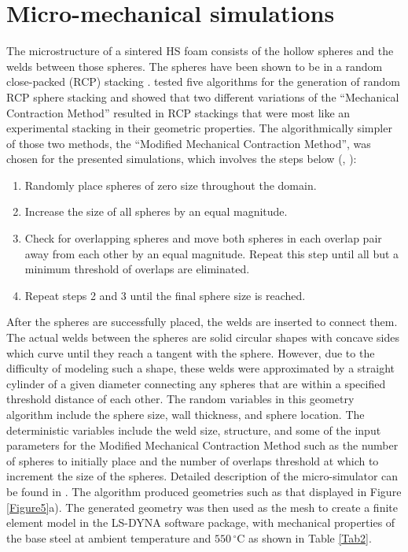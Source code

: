 \documentclass[review]{elsarticle}
\begin{document}
{\section{Micro-mechanical simulations}

The microstructure of a sintered HS foam consists of the hollow spheres and the welds between those spheres. The spheres have been shown to be in a random close-packed (RCP) stacking \cite{Gaoetal2008}. \cite{WouPhi2006} tested five algorithms for the generation of random RCP sphere stacking and showed that two different variations of the “Mechanical Contraction Method” resulted in RCP stackings that were most like an experimental stacking in their geometric properties. The algorithmically simpler of those two methods, the “Modified Mechanical Contraction Method”, was chosen for the presented simulations, which involves the steps below (\cite{Kansaletal2002}, \cite{WilliamsandPhilipse2003}):

\begin{enumerate}
	\item Randomly place spheres of zero size throughout the domain.
	\item Increase the size of all spheres by an equal magnitude.
	\item Check for overlapping spheres and move both spheres in each overlap pair away from each other by an equal magnitude. Repeat this step until all but a minimum threshold of overlaps are eliminated.
	\item Repeat steps 2 and 3 until the final sphere size is reached.
\end{enumerate}

After the spheres are successfully placed, the welds are inserted to connect them. The actual welds between the spheres are solid circular shapes with concave sides which curve until they reach a tangent with the sphere. However, due to the difficulty of modeling such a shape, these welds were approximated by a straight cylinder of a given diameter connecting any spheres that are within a specified threshold distance of each other. The random variables in this geometry algorithm include the sphere size, wall thickness, and sphere location. The deterministic variables include the weld size, structure, and some of the input parameters for the Modified Mechanical Contraction Method such as the number of spheres to initially place and the number of overlaps threshold at which to increment the size of the spheres. Detailed description of the micro-simulator can be found in \cite{Smith2012}. The algorithm produced geometries such as that displayed in Figure \ref{Figure5}a). The generated geometry was then used as the mesh to create a finite element model in the LS-DYNA software package, with mechanical properties of the base steel at ambient temperature and $550\,^{\circ}\mathrm{C}$ as shown in Table \ref{Tab2}.



}
\end{document}
